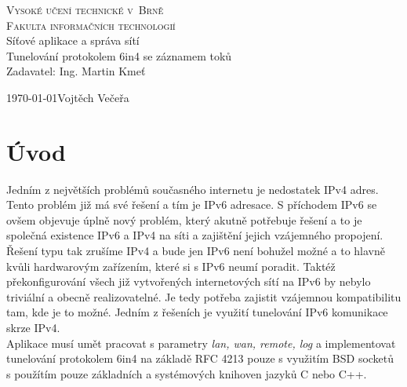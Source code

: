 \documentclass[12pt,a4paper,onecolumn]{article}
\begin{document}
\begin{titlepage}
    \begin{center}
        \textsc{\Huge Vysoké učení technické v~Brně\\\huge Fakulta informačních technologií}\\
        \LARGE Síťové aplikace a správa sítí\\
        \Huge Tunelování protokolem 6in4 se záznamem toků\\
        \large Zadavatel: Ing. Martin Kmeť\\
    \end{center}
    {\Large\today\hfill Vojtěch Večeřa }
\end{titlepage}
\tableofcontents
\newpage
\section{Úvod}
Jedním z největších problémů současného internetu je nedostatek IPv4 adres. Tento problém již má
své řešení a tím je IPv6 adresace. S příchodem IPv6 se ovšem objevuje úplně nový problém, který
akutně potřebuje řešení a to je společná existence IPv6 a IPv4 na síti a zajištění jejich
vzájemného propojení. Řešení typu tak zrušíme IPv4 a bude jen IPv6 není bohužel možné a to hlavně
kvůli hardwarovým zařízením, které si s IPv6 neumí poradit. Taktéž překonfigurování všech
již vytvořených internetových sítí na IPv6 by nebylo triviální a obecně realizovatelné. Je tedy
potřeba zajistit vzájemnou kompatibilitu tam, kde je to možné. Jedním z řešeních je využití
tunelování IPv6 komunikace skrze IPv4.\\
\indent Aplikace musí umět pracovat s parametry {\it lan, wan, remote, log} a implementovat
tunelování protokolem 6in4 na základě RFC 4213 pouze s využitím BSD socketů s použítím pouze
základních a systémových knihoven jazyků C nebo C++. 
\end{document}
